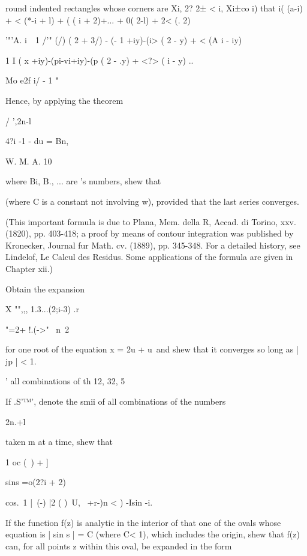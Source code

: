 \begin{wandwmiscexamples}
\begin{wandwmiscexample}
    round indented rectangles whose corners are Xi, 2? 2± < i, Xi±co i)
    that i( (a-i) + < (*-i + l) + ( ( i + 2)+... + 0( 2-l) + 2< (. 2)

    '"'A. i~\, 1 /'" (/) ( 2 + 3/) - (- 1 +iy)-(i> ( 2 - y) + < (A i -
    iy)

    1 I ( x +iy)-(pi-vi+iy)-(p ( 2 - .y) + <?> ( i - y) ..

    Mo e2f i/ - 1  "

    Hence, by applying the theorem

    / ',2n-l

    4?i -1 - du = Bn,

    W. M. A. 10


    where Bi, B., ... are \Bernoulli's numbers, shew that

    (where C is a constant not involving w), provided that the last series
    converges.

    (This important formula is due to Plana, Mem. della R, Accad. di
    Torino, xxv. (1820), pp. 403-418; a proof by means of contour
    integration was published by Kronecker, Journal fur Math. cv. (1889),
    pp. 345-348. For a detailed history, see Lindelof, Le Calcul des
    Residus. Some applications of the formula are given in Chapter xii.)
  \end{wandwmiscexample}
  \begin{wandwmiscexample}
    Obtain the expansion

    X "",,, 1.3...(2;i-3) .r

    "=2+ !.(->"~ n\ 2

    for one root of the equation x = 2u + u\ and shew that it converges so
    long as | jp | < 1.

    ' all combinations of th 12, 32, 5%
  \end{wandwmiscexample}
  \begin{wandwmiscexample}
    If .S'™', denote the smii of all combinations of the numbers

    2n.+l

    taken m at a time, shew that

    1 oc (\ ) + ]

    sins =o(2?i + 2)

    cos.\ 1 |\ (-) |2 ( )\ U, \ +r-)n < ) -Isin -i.

  \end{wandwmiscexample}
  \begin{wandwmiscexample}
    If the function f(z) is analytic in the interior of that one of
    the ovals whose equation is | sin s | = C (where C< 1), which includes
    the origin, shew that f(z) can, for all points z within this oval, be
    expanded in the form


\end{wandwmiscexample}
\end{wandwmiscexamples}
